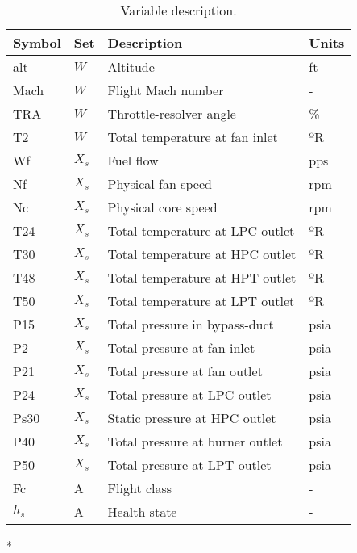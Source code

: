 \documentclass[PHM, 2021]{PHMSociety}
\begin{document}
\begin{table}[]
\caption{Variable description.}
\begin{tabular}{llll}
\hline
Symbol & Set & Description                     & Units \\ \hline
alt    & $W$   & Altitude                        & ft    \\
Mach   & $W$   & Flight Mach number              & -     \\
TRA    & $W$   & Throttle-resolver angle         & \%     \\
T2     & $W$   & Total temperature at fan inlet  & ºR    \\
Wf     & $X_s$ & Fuel flow                       & pps   \\
Nf     & $X_s$ & Physical fan speed              & rpm   \\
Nc     & $X_s$ & Physical core speed             & rpm   \\
T24    & $X_s$ & Total temperature at LPC outlet & ºR    \\
T30    & $X_s$ & Total temperature at HPC outlet & ºR    \\
T48    & $X_s$ & Total temperature at HPT outlet & ºR    \\
T50    & $X_s$ & Total temperature at LPT outlet & ºR    \\
P15    & $X_s$ & Total pressure in bypass-duct   & psia  \\
P2     & $X_s$ & Total pressure at fan inlet     & psia  \\
P21    & $X_s$ & Total pressure at fan outlet    & psia  \\
P24    & $X_s$ & Total pressure at LPC outlet    & psia  \\
Ps30   & $X_s$ & Static pressure at HPC outlet   & psia  \\
P40    & $X_s$ & Total pressure at burner outlet & psia  \\
P50    & $X_s$ & Total pressure at LPT outlet    & psia  \\
Fc     & A   & Flight class                    & -     \\
$h_s$    & A   & Health state                    & -    
\end{tabular}
\label{table:variables}
\end{table}

\/*
\end{document}
